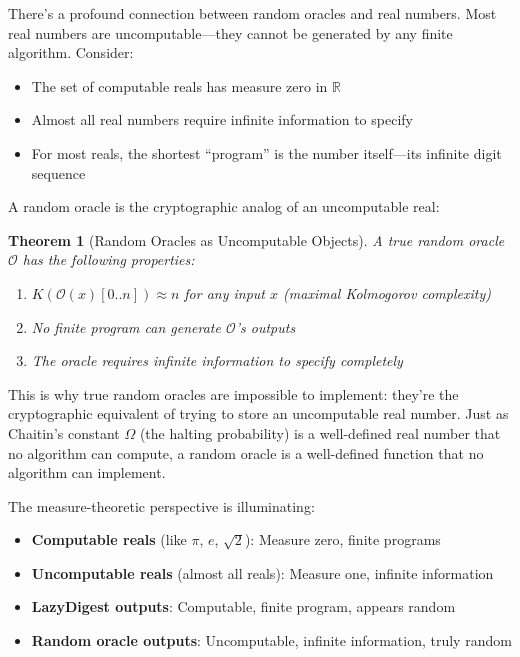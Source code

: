 \documentclass[11pt]{article}
\newtheorem{theorem}{Theorem}
\begin{document}
There's a profound connection between random oracles and real numbers. Most real numbers are uncomputable---they cannot be generated by any finite algorithm. Consider:

\begin{itemize}
\item The set of computable reals has measure zero in $\mathbb{R}$
\item Almost all real numbers require infinite information to specify
\item For most reals, the shortest ``program'' is the number itself---its infinite digit sequence
\end{itemize}

A random oracle is the cryptographic analog of an uncomputable real:

\begin{theorem}[Random Oracles as Uncomputable Objects]
A true random oracle $\mathcal{O}$ has the following properties:
\begin{enumerate}
\item $K(\mathcal{O}(x)[0..n]) \approx n$ for any input $x$ (maximal Kolmogorov complexity)
\item No finite program can generate $\mathcal{O}$'s outputs
\item The oracle requires infinite information to specify completely
\end{enumerate}
\end{theorem}

This is why true random oracles are impossible to implement: they're the cryptographic equivalent of trying to store an uncomputable real number. Just as Chaitin's constant $\Omega$ (the halting probability) is a well-defined real number that no algorithm can compute, a random oracle is a well-defined function that no algorithm can implement.

The measure-theoretic perspective is illuminating:
\begin{itemize}
\item \textbf{Computable reals} (like $\pi$, $e$, $\sqrt{2}$): Measure zero, finite programs
\item \textbf{Uncomputable reals} (almost all reals): Measure one, infinite information
\item \textbf{LazyDigest outputs}: Computable, finite program, appears random
\item \textbf{Random oracle outputs}: Uncomputable, infinite information, truly random
\end{itemize}
\end{document}
